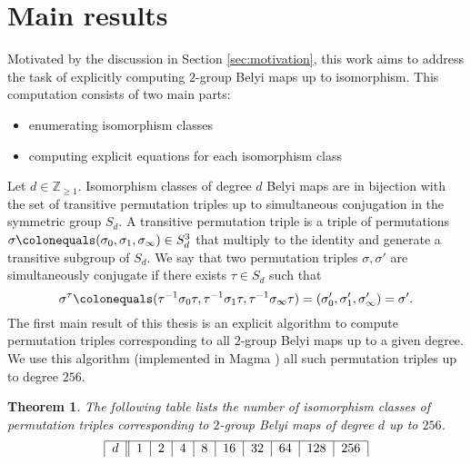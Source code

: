 \documentclass{dcthesis}
\newcommand{\ZZ}{\mathbb Z}
\newcommand{\defi}[1]{\textsf{#1}}
\numberwithin{equation}{section}
\newtheorem{theorem}[equation]{Theorem}
\theoremstyle{definition}
\theoremstyle{remark}
\begin{document}
{{  \section{Main results}{\label{sec:mainresults}
    Motivated by the discussion in
    Section \ref{sec:motivation},
    this work aims to address the task
    of explicitly computing
    $2$-group Belyi maps up to isomorphism.
    This computation consists of two
    main parts:
    \begin{itemize}
      \item
        enumerating isomorphism classes
      \item
        computing explicit equations
        for each isomorphism class
    \end{itemize}
    \par
    Let $d\in\ZZ_{\geq 1}$.
    Isomorphism classes of degree $d$
    Belyi maps
    are in bijection with
    the set of
    transitive permutation triples
    up to
    simultaneous conjugation
    in the symmetric group $S_d$.
    A \defi{transitive permutation triple}
    is a triple of permutations
    $\sigma\colonequals
    (\sigma_0,\sigma_1,\sigma_\infty)
    \in S_d^3$
    that multiply to the identity
    and generate a transitive subgroup
    of $S_d$.
    We say
    that two permutation triples
    $\sigma,\sigma'$ are
    \defi{simultaneously conjugate}
    if there exists $\tau\in S_d$ such that
    \begin{equation}\label{eqn:simconj_results}
      \sigma^\tau \colonequals
      (\tau^{-1}\sigma_0\tau, \tau^{-1}\sigma_1\tau, \tau^{-1}\sigma_\infty\tau)
      = \left(\sigma'_0,\sigma'_1,\sigma'_\infty\right)
      = \sigma'.
    \end{equation}
    The first main result of this thesis
    is an explicit algorithm
    to compute permutation triples
    corresponding to all $2$-group Belyi
    maps up to a given degree.
    We use this algorithm (implemented in
    \textsf{Magma} \cite{magma})
    all such permutation triples up to
    degree $256$.
    \begin{theorem}\label{thm:isoclasses_results}
      The following table lists
      the number of isomorphism classes of
      permutation triples corresponding to
      $2$-group Belyi maps
      of degree $d$ up to $256$.
      \begin{equation}
        \label{eqn:}
        \begin{tabular}{|c||c|c|c|c|c|c|c|c|c|}
          \hline
          $d$ & $1$ & $2$ & $4$ & $8$ & $16$ & $32$ & $64$ & $128$ & $256$\\

\end{tabular}
\end{equation}
\end{theorem}}}}
\end{document}
